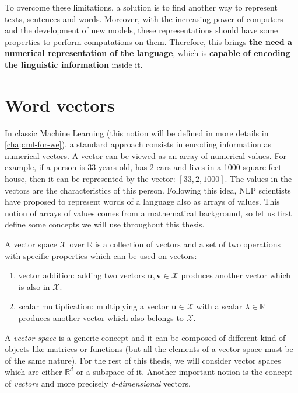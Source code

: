   To overcome these limitations, a solution is to find another way to represent
  texts, sentences and words. Moreover, with the increasing power of computers
  and the development of new models, these representations should have some
  properties to perform computations on them. Therefore, this brings \textbf{the
  need a numerical representation of the language}, which is \textbf{capable of
  encoding the linguistic information} inside it.

\section{Word vectors}
  In classic Machine Learning (this notion will be defined in more details in
  \autoref{chap:ml-for-we}), a standard approach consists in encoding
  information as numerical vectors. A vector can be viewed as an array of
  numerical values. For example, if a person is 33 years old, has 2 cars and
  lives in a 1000 square feet house, then it can be represented by the vector:
  $[33, 2, 1000]$. The values in the vectors are the characteristics of this
  person. Following this idea, NLP scientists have proposed to represent words
  of a language also as arrays of values. This notion of arrays of values comes
  from a mathematical background, so let us first define some concepts we will
  use throughout this thesis.

  \theoremstyle{definition}
  \begin{definition}
    \label{ch01:def:def-vector-space}
    A vector space $\mathcal{X}$ over $\mathbb{R}$ is a collection of vectors
    and a set of two operations with specific properties which can be used on
    vectors:
    \begin{enumerate}
      \item vector addition: adding two vectors $\mathbf{u}, \mathbf{v} \in
        \mathcal{X}$ produces another vector which is also in $\mathcal{X}$.
      \item scalar multiplication: multiplying a vector $\mathbf{u} \in
        \mathcal{X}$ with a scalar $\lambda \in \mathbb{R}$ produces another
        vector which also belongs to $\mathcal{X}$.
    \end{enumerate}
  \end{definition}

  A \textit{vector space} is a generic concept and it can be composed
  of different kind of objects like matrices or functions (but all the elements
  of a vector space must be of the same nature). For the rest of this thesis, we
  will consider vector spaces which are either $\mathbb{R}^d$ or a subspace of
  it. Another important notion is the concept of \textit{vectors} and more
  precisely \textit{d-dimensional} vectors.


